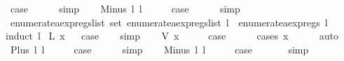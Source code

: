 \begin{isabellebody}
\ {\isacharquery}case\isanewline
\ \ \ \ \isamarkupfalse%
\ simp\isanewline
{}\isamarkupfalse%
\isanewline
\ \ \isamarkupfalse%
\ {\isacharparenleft}Minus\ l{}\ l{}{\isacharparenright}\isanewline
\ \ \isamarkupfalse%
\ \isamarkupfalse%
\ {\isacharquery}case\isanewline
\ \ \ \ \isamarkupfalse%
\ simp\isanewline
{}\isamarkupfalse%
%
\endisatagproof
{\isafoldproof}%
%
\isadelimproof
\isanewline
%
\endisadelimproof
\isanewline
{}\isamarkupfalse%
\ enumerate{\isacharunderscore}aexp{\isacharunderscore}regs{\isacharunderscore}list{\isacharcolon}\ {\isachardoublequoteopen}set\ {\isacharparenleft}enumerate{\isacharunderscore}aexp{\isacharunderscore}regs{\isacharunderscore}list\ l{\isacharparenright}\ {\isacharequal}\ enumerate{\isacharunderscore}aexp{\isacharunderscore}regs\ l{\isachardoublequoteclose}\isanewline
%
\isadelimproof
%
\endisadelimproof
%
\isatagproof
{}\isamarkupfalse%
{\isacharparenleft}induct\ l{\isacharparenright}\isanewline
{}\isamarkupfalse%
\ {\isacharparenleft}L\ x{\isacharparenright}\isanewline
{}\isamarkupfalse%
\ \isamarkupfalse%
\ {\isacharquery}case\isanewline
\ \ \isamarkupfalse%
\ simp\isanewline
{}\isamarkupfalse%
\isanewline
\ \ \isamarkupfalse%
\ {\isacharparenleft}V\ x{\isacharparenright}\isanewline
\ \ \isamarkupfalse%
\ \isamarkupfalse%
\ {\isacharquery}case\isanewline
\ \ \ \ \isamarkupfalse%
\ {\isacharparenleft}cases\ x{\isacharparenright}\isanewline
\ \ \ \ \isamarkupfalse%
\ auto\isanewline
{}\isamarkupfalse%
\isanewline
\ \ \isamarkupfalse%
\ {\isacharparenleft}Plus\ l{}\ l{}{\isacharparenright}\isanewline
\ \ \isamarkupfalse%
\ \isamarkupfalse%
\ {\isacharquery}case\isanewline
\ \ \ \ \isamarkupfalse%
\ simp\isanewline
{}\isamarkupfalse%
\isanewline
\ \ \isamarkupfalse%
\ {\isacharparenleft}Minus\ l{}\ l{}{\isacharparenright}\isanewline
\ \ \isamarkupfalse%
\ \isamarkupfalse%
\ {\isacharquery}case\ \isanewline
\ \ \ \ \isamarkupfalse%
\ simp\isanewline
{}\isamarkupfalse%
%
\endisatagproof
{\isafoldproof}%
%
\isadelimproof
\isanewline
%
\endisadelimproof
\isanewline
\isanewline
{}\isamarkupfalse%

\end{isabellebody}
